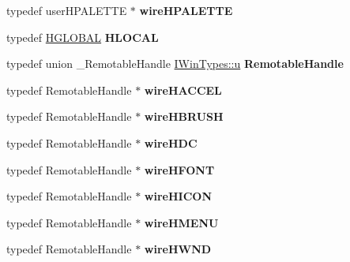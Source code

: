 \begin{DoxyCompactItemize}
\item 
\mbox{\label{interface_i_win_types_a3ff11bc2ee78413362007267f5d82ab3}} 
typedef user\+H\+P\+A\+L\+E\+T\+TE $\ast$ {\bfseries wire\+H\+P\+A\+L\+E\+T\+TE}
\item 
\mbox{\label{interface_i_win_types_a8de1c42f616d7c9c098eba2dd6335702}} 
typedef \hyperlink{interfacevoid}{H\+G\+L\+O\+B\+AL} {\bfseries H\+L\+O\+C\+AL}
\item 
\mbox{\label{interface_i_win_types_a1bcad73e41a95ca200bc00a1e725f604}} 
typedef union \+\_\+\+Remotable\+Handle \hyperlink{union_i_win_types_1_1u}{I\+Win\+Types\+::u} {\bfseries Remotable\+Handle}
\item 
\mbox{\label{interface_i_win_types_a28e2804c26ef5fb290cbd3b0fb801549}} 
typedef Remotable\+Handle $\ast$ {\bfseries wire\+H\+A\+C\+C\+EL}
\item 
\mbox{\label{interface_i_win_types_a36d75253abe9e62cc10231a2add042d3}} 
typedef Remotable\+Handle $\ast$ {\bfseries wire\+H\+B\+R\+U\+SH}
\item 
\mbox{\label{interface_i_win_types_a3219b355d74b11935f7a9d4badb73a5a}} 
typedef Remotable\+Handle $\ast$ {\bfseries wire\+H\+DC}
\item 
\mbox{\label{interface_i_win_types_a3a549a991e3950978ee5fc41328a698d}} 
typedef Remotable\+Handle $\ast$ {\bfseries wire\+H\+F\+O\+NT}
\item 
\mbox{\label{interface_i_win_types_aff746f576e838f736f5d83a8fb76dc6b}} 
typedef Remotable\+Handle $\ast$ {\bfseries wire\+H\+I\+C\+ON}
\item 
\mbox{\label{interface_i_win_types_a62400826b07bf80cc7fe6b32915cbf42}} 
typedef Remotable\+Handle $\ast$ {\bfseries wire\+H\+M\+E\+NU}
\item 
\mbox{\label{interface_i_win_types_ad748a1e3cedf34cab464054380a8beda}} 
typedef Remotable\+Handle $\ast$ {\bfseries wire\+H\+W\+ND}

\end{DoxyCompactItemize}
